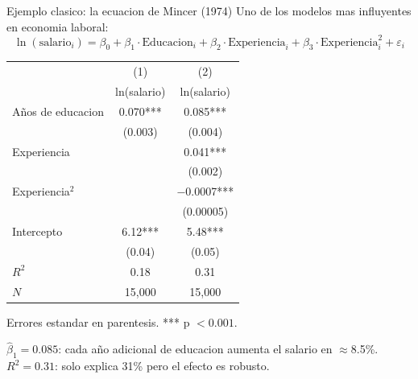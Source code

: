 \documentclass[aspectratio=169, 11pt]{beamer}
\begin{document}
\begin{frame}{Ejemplo clasico: la ecuacion de Mincer (1974)}
\small
Uno de los modelos mas influyentes en economia laboral:
\[
\ln(\text{salario}_i) = \beta_0 + \beta_1 \cdot \text{Educacion}_i + \beta_2 \cdot \text{Experiencia}_i + \beta_3 \cdot \text{Experiencia}_i^2 + \varepsilon_i
\]

\vspace{0.1cm}
\begin{center}
\footnotesize
\begin{tabular}{lcc}
\toprule
& (1) & (2) \\
& ln(salario) & ln(salario) \\
\midrule
A\~nos de educacion & 0.070*** & 0.085*** \\
& (0.003) & (0.004) \\
Experiencia & & 0.041*** \\
& & (0.002) \\
Experiencia$^2$ & & $-$0.0007*** \\
& & (0.00005) \\
Intercepto & 6.12*** & 5.48*** \\
& (0.04) & (0.05) \\
\midrule
$R^2$ & 0.18 & 0.31 \\
$N$ & 15{,}000 & 15{,}000 \\
\bottomrule
\end{tabular}
\end{center}
\footnotesize Errores estandar en parentesis. *** p $< 0.001$.

\vspace{0.1cm}
\small $\hat{\beta}_1 = 0.085$: cada a\~no adicional de educacion aumenta el salario en $\approx$8.5\%. $R^2 = 0.31$: solo explica 31\% pero el efecto es robusto.
\end{frame}
\end{document}
